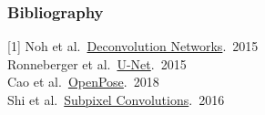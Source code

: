 \documentclass[xetex,professionalfont]{beamer}
\let\oldemph\emph
\renewcommand\emph[1]{\textcolor{tuwcvl_cvl_blue}{#1}}
\begin{document}
\renewcommand\emph[1]{\oldemph{#1}}

\begin{frame}
	\frametitle{Bibliography}

	[1] Noh et al.~\href{https://arxiv.org/abs/1505.04366}{Deconvolution Networks}.~2015 \\\medskip
	[2] Ronneberger et al.~\href{https://arxiv.org/abs/1505.04597}{U-Net}.~2015 \\\medskip
	[3] Cao et al.~\href{https://arxiv.org/abs/1812.08008}{OpenPose}.~2018 \\\medskip
	[4] Shi et al.~\href{https://arxiv.org/abs/1609.05158}{Subpixel Convolutions}.~2016

\end{frame}
\end{document}
